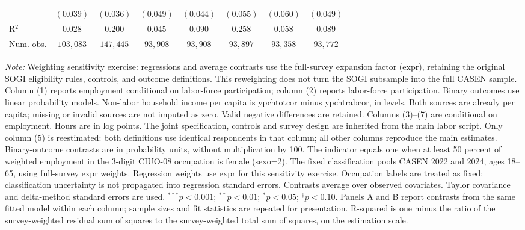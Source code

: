 \begin{table}[htpb!]
{\begin{tabular}{l c c c c c c c}
 & $(0.039)$ & $(0.036)$ & $(0.049)$ & $(0.044)$ & $(0.055)$ & $(0.060)$ & $(0.049)$ \\
\hline
R$^2$ & $0.028$ & $0.200$ & $0.045$ & $0.090$ & $0.258$ & $0.058$ & $0.089$ \\
Num. obs. & $103,083$ & $147,445$ & $93,908$ & $93,908$ & $93,897$ & $93,358$ & $93,772$ \\
\hline
\end{tabular}%
}
\par\vspace{1ex}
\begin{minipage}{\textwidth}\footnotesize\raggedright
\textit{Note:} Weighting sensitivity exercise: regressions and average contrasts use the full-survey expansion factor (expr), retaining the original SOGI eligibility rules, controls, and outcome definitions. This reweighting does not turn the SOGI subsample into the full CASEN sample. Column (1) reports employment conditional on labor-force participation; column (2) reports labor-force participation. Binary outcomes use linear probability models. Non-labor household income per capita is ypchtotcor minus ypchtrabcor, in levels. Both sources are already per capita; missing or invalid sources are not imputed as zero. Valid negative differences are retained.  Columns (3)--(7) are conditional on employment. Hours are in log points. The joint specification, controls and survey design are inherited from the main labor script. Only column (5) is reestimated: both definitions use identical respondents in that column; all other columns reproduce the main estimates. Binary-outcome contrasts are in probability units, without multiplication by 100. The indicator equals one when at least 50 percent of weighted employment in the 3-digit CIUO-08 occupation is female (sexo=2). The fixed classification pools CASEN 2022 and 2024, ages 18--65, using full-survey expr weights. Regression weights use expr for this sensitivity exercise. Occupation labels are treated as fixed; classification uncertainty is not propagated into regression standard errors. Contrasts average over observed covariates. Taylor covariance and delta-method standard errors are used. $^{***}p<0.001$; $^{**}p<0.01$; $^{*}p<0.05$; $^{\dagger}p<0.10$. Panels A and B report contrasts from the same fitted model within each column; sample sizes and fit statistics are repeated for presentation. R-squared is one minus the ratio of the survey-weighted residual sum of squares to the survey-weighted total sum of squares, on the estimation scale.
\end{minipage}
\end{table}
